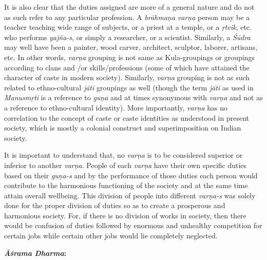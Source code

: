 It is also clear that the duties assigned are more of a general nature and do not as such refer to any particular profession. A \emph{brāhmaṇa} \emph{varṇa} person may be a teacher teaching wide range of subjects, or a priest at a temple, or a \emph{ṛtvik}, etc. who performs \emph{yajña-s}, or simply a researcher, or a scientist. Similarly, a \emph{Śūdra} may well have been a painter, wood carver, architect, sculptor, laborer, artisans, etc. In other words, \emph{varṇa} grouping is not same as Kula-groupings or groupings according to clans and /or skills/professions (some of which have attained the character of caste in modern society). Similarly, \emph{varṇa} grouping is not as such related to ethno-cultural \emph{jāti} groupings as well (though the term \emph{jāti} as used in \emph{Manusmṛti} is a reference to \emph{guṇa} and at times synonymous with \emph{varṇa} and not as a reference to ethno-cultural identity). More importantly, \emph{varṇa} has no correlation to the concept of caste or caste identities as understood in present society, which is mostly a colonial construct and superimposition on Indian society.
\vskip 2pt

It is important to understand that, no \emph{varṇa} is to be considered superior or inferior to another \emph{varṇa}. People of each \emph{varṇa} have their own specific duties based on their \emph{guṇa-s} and by the performance of those duties each person would contribute to the harmonious functioning of the society and at the same time attain overall wellbeing. This division of people into different \emph{varṇa-s} was solely done for the proper division of duties so as to create a prosperous and harmonious society. For, if there is no division of works in society, then there would be confusion of duties followed by enormous and unhealthy competition for certain jobs while certain other jobs would lie completely neglected.
\bigskip

\textbf{\emph{Āśrama} \emph{Dharma}:}

